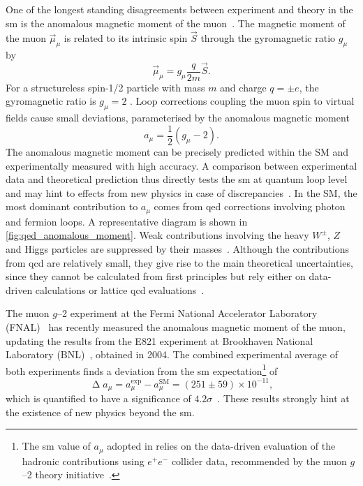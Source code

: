 One of the longest standing disagreements between experiment and theory in the \gls{sm} is the anomalous magnetic moment of the muon~\cite{pdg2020}. The magnetic moment of the muon $\vec{\mu}_\mu$ is related to its intrinsic spin $\vec{S}$ through the gyromagnetic ratio $g_\mu$ by
\begin{equation}
	\vec{\mu}_\mu = g_\mu \frac{q}{2m} \vec{S}.
\end{equation}
For a structureless spin-1/2 particle with mass $m$ and charge $q=\pm e$, the gyromagnetic ratio is \mbox{$g_\mu = 2$} \cite{Bennett:2006fi}. Loop corrections coupling the muon spin to virtual fields cause small deviations, parameterised by the anomalous magnetic moment
\begin{equation}
	a_\mu = \frac{1}{2}(g_\mu-2).
\end{equation}
The anomalous magnetic moment can be precisely predicted within the SM and experimentally measured with high accuracy. A comparison between experimental data and theoretical prediction thus directly tests the \gls{sm} at quantum loop level and may hint to effects from new physics in case of discrepancies~\cite{baer_tata_2006}.
In the SM, the most dominant contribution to $a_\mu$ comes from \gls{qed} corrections involving photon and fermion loops.
A representative diagram is shown in \cref{fig:qed_anomalous_moment}. Weak contributions involving the heavy $W^\pm$, $Z$ and Higgs particles are suppressed by their masses~\cite{Aoyama:2020ynm}.
Although the contributions from \gls{qcd} are relatively small, they give rise to the main theoretical uncertainties, since they cannot be calculated from first principles but rely either on data-driven calculations or lattice \gls{qcd} evaluations~\cite{Aoyama:2020ynm}.

The muon $g$--2 experiment at the Fermi National Accelerator Laboratory (FNAL)~\cite{Abi:2021gix} has recently measured the anomalous magnetic moment of the muon, updating the results from the E821 experiment at Brookhaven National Laboratory (BNL)~\cite{Bennett:2006fi}, obtained in 2004. The combined experimental average of both experiments finds a deviation from the \gls{sm} expectation\footnote{The \gls{sm} value of $a_\mu$ adopted in \cite{Abi:2021gix} relies on the data-driven evaluation of the hadronic contributions using $e^+e^-$ collider data, recommended by the muon $g$--2 theory initiative~\cite{Aoyama:2020ynm}.} of
\begin{equation}
	\upDelta a_\mu = a^\mathrm{exp}_\mu - a^\mathrm{SM}_\mu = (251\pm59)\times 10^{-11},
\end{equation}
which is quantified to have a significance of $4.2\sigma$~\cite{Abi:2021gix}. These results strongly hint at the existence of new physics beyond the \gls{sm}.

